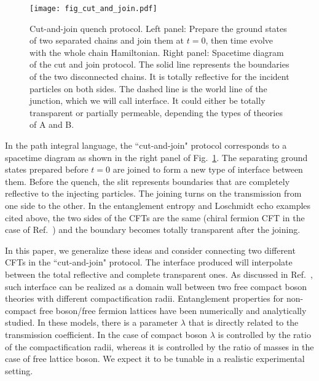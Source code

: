 \begin{figure}[h]
\texttt{[image: fig\_cut\_and\_join.pdf]}
\caption{Cut-and-join quench protocol. Left panel: Prepare the ground states of two separated chains and join them at $t = 0$, then time evolve with the whole chain Hamiltonian. Right panel: Spacetime diagram of the cut and join protocol. The solid line represents the boundaries of the two disconnected chains. It is totally reflective for the incident particles on both sides. The dashed line is the world line of the junction, which we will call interface. It could either be totally transparent or partially permeable, depending the types of theories of A and B.}
\label{fig:cut-and-join}
\end{figure}

In the path integral language, the ``cut-and-join" protocol corresponds to a spacetime diagram as shown in the right panel of Fig.~\ref{fig:cut-and-join}. The separating ground states prepared before $t = 0$ are joined to form a new type of interface between them. Before the quench, the slit represents boundaries that are completely reflective to the injecting particles. The joining turns on the transmission from one side to the other. In the entanglement entropy and Loschmidt echo examples cited above\cite{calabrese_entanglement_2007, calabrese_quantum_2016, vasseur_universal_2014}, the two sides of the CFTs are the same (chiral fermion CFT in the case of Ref.~) and the boundary becomes totally transparent after the joining. 

In this paper, we generalize these ideas and consider connecting two different CFTs in the ``cut-and-join" protocol. The interface produced will interpolate between the total reflective and complete transparent ones. As discussed in Ref.~, such interface can be realized as a domain wall between two free compact boson theories with different compactification radii. Entanglement properties for non-compact free boson/free fermion lattices have been numerically and analytically studied\cite{peschel_exact_2012,sakai_entanglement_2008}. In these models, there is a parameter $\lambda$ that is directly related to the transmission coefficient. In the case of compact boson $\lambda$ is controlled by the ratio of the compactification radii, whereas it is controlled by the ratio of masses in the case of free lattice boson. We expect it to be tunable in a realistic experimental setting.

